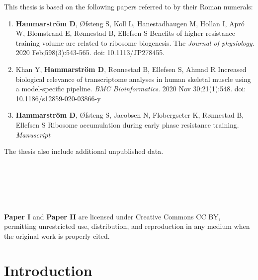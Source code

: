 \documentclass[twoside,10pt]{gihclass} %
\def\labelenumi{\Roman{enumi}.}
\begin{document}
  \begin{listofpapers}
    This thesis is based on the following papers referred to by their Roman numerals:
    \begin{enumerate}
    \def\labelenumi{\Roman{enumi}.}
    \item
      \textbf{Hammarström D}, Øfsteng S, Koll L, Hanestadhaugen M, Hollan I, Apró W, Blomstrand E, Rønnestad B, Ellefsen S Benefits of higher resistance-training volume are related to ribosome biogenesis. The \emph{Journal of physiology}. 2020 Feb;598(3):543-565. doi: 10.1113/JP278455.
    \item
      Khan Y, \textbf{Hammarström D}, Rønnestad B, Ellefsen S, Ahmad R Increased biological relevance of transcriptome analyses in human skeletal muscle using a model-specific pipeline. \emph{BMC Bioinformatics}. 2020 Nov 30;21(1):548. doi: 10.1186/s12859-020-03866-y
    \item
      \textbf{Hammarström D}, Øfsteng S, Jacobsen N, Flobergseter K, Rønnestad B, Ellefsen S Ribosome accumulation during early phase resistance training. \emph{Manuscript}
    \end{enumerate}
    The thesis also include additional unpublished data.\\
    ~\\
    ~\\
    ~\\
    ~\\
    ~\\

    \footnotesize

    \textbf{Paper I} and \textbf{Paper II} are licensed under Creative Commons CC BY, permitting unrestricted use, distribution, and reproduction in any medium when the original work is properly cited.
  \end{listofpapers}

  \hypersetup{linkcolor=black}
  \setcounter{tocdepth}{2}
  \tableofcontents

  \listoftables

  \listoffigures




\mainmatter %
\pagestyle{fancyplain} %

\setcounter{DefaultLines}{3}

\hypertarget{introduction}{%
\chapter{Introduction}\label{introduction}}
\end{document}
